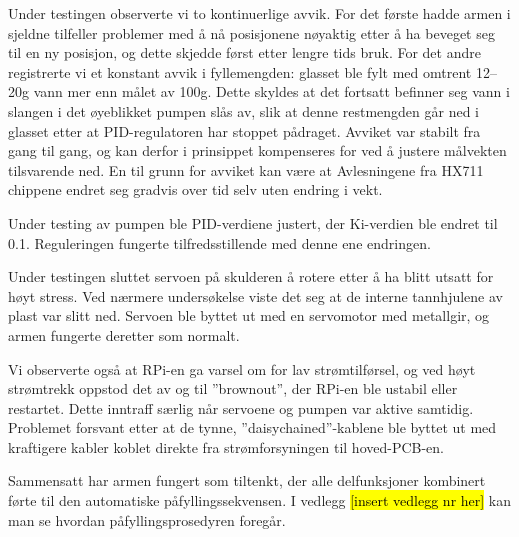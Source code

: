 Under testingen observerte vi to kontinuerlige avvik. For det første hadde armen i sjeldne tilfeller problemer med å nå posisjonene nøyaktig etter å ha beveget seg til en ny posisjon, og dette skjedde først etter lengre tids bruk. For det andre registrerte vi et konstant avvik i fyllemengden: glasset ble fylt med omtrent 12–20g vann mer enn målet av 100g. Dette skyldes at det fortsatt befinner seg vann i slangen i det øyeblikket pumpen slås av, slik at denne restmengden går ned i glasset etter at PID-regulatoren har stoppet pådraget. Avviket var stabilt fra gang til gang, og kan derfor i prinsippet kompenseres for ved å justere målvekten tilsvarende ned. En til grunn for avviket kan være at Avlesningene fra HX711 chippene endret seg gradvis over tid selv uten endring i vekt. 

Under testing av pumpen ble PID-verdiene justert, der Ki-verdien ble endret til 0.1. Reguleringen fungerte tilfredsstillende med denne ene endringen.

Under testingen sluttet servoen på skulderen å rotere etter å ha blitt utsatt for høyt stress. Ved nærmere undersøkelse viste det seg at de interne tannhjulene av plast var slitt ned. Servoen ble byttet ut med en servomotor med metallgir, og armen fungerte deretter som normalt.

Vi observerte også at RPi-en ga varsel om for lav strømtilførsel, og ved høyt strømtrekk oppstod det av og til ''brownout'', der RPi-en ble ustabil eller restartet. Dette inntraff særlig når servoene og pumpen var aktive samtidig. Problemet forsvant etter at de tynne, ''daisychained''-kablene ble byttet ut med kraftigere kabler koblet direkte fra strømforsyningen til hoved-PCB-en.

Sammensatt har armen fungert som tiltenkt, der alle delfunksjoner kombinert førte til den automatiske påfyllingssekvensen. I vedlegg \hl{[insert vedlegg nr her]} kan man se hvordan påfyllingsprosedyren foregår.